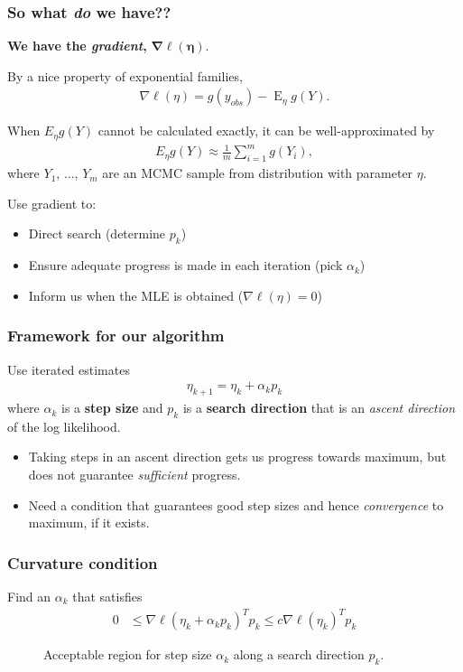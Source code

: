 \documentclass[ 10pt]{beamer}
\DeclareMathOperator{\E}{E}
\begin{document}
\frame
{
\frametitle{So what \emph{do} we have??}

{\textbf{We have the \emph{gradient},} $\boldsymbol{\nabla \ell(\eta)}$.}
\vspace*{2mm}

By a nice property of exponential families,
\begin{align*}
	\nabla \ell( \eta ) = g(y_{obs}) - \E_{\eta} g(Y).
\end{align*}

\pause
When $E_\eta g(Y)$ cannot be calculated exactly, it can be well-approximated by
\begin{align*}
E_\eta g(Y) \approx \frac{1}{m}\sum_{i = 1}^m g(Y_i),
\end{align*}
where $Y_1$, $\ldots$, $Y_m$ are an MCMC sample from distribution with parameter $\eta$.
\vspace*{4mm}

\pause
Use gradient to: 
\vspace*{2mm}
\begin{itemize}
\item Direct search  (determine $p_k$)
\vspace*{2mm}

\item Ensure adequate progress is made in each iteration  (pick $\alpha_k$)
\vspace*{2mm}

\item Inform us when the MLE is obtained  ($\nabla \ell(\eta) = 0$)
\end{itemize}

}

\frame
{
\frametitle{Framework for our algorithm}
Use iterated estimates
\begin{align*}
	\eta_{k+1} = \eta_k + \alpha_k p_k
\end{align*}
where $\alpha_k$ is a \textbf{step size} and  $p_k$ is a \textbf{search direction} that
is an \emph{ascent direction} of the log likelihood.
\vspace{3mm}

\pause
\begin{itemize}
\item Taking steps in an ascent direction gets us progress towards maximum, but does not guarantee \emph{sufficient} progress.
\vspace{3mm}

\item Need a condition that guarantees good step sizes and hence \emph{convergence} to maximum, if it exists.
\end{itemize}

}
\frame
{
  \frametitle{Curvature condition}
Find an $\alpha_k$ that satisfies
\begin{align*}
	 0 & \leq \nabla \ell( \eta_k + \alpha_k p_k)^T p_k \leq c \nabla \ell(\eta_k)^T 
p_k
\end{align*}
\begin{figure}[h]
\centering
    \scalebox{.25}{}
	\caption{Acceptable region for step size $\alpha_k$ along a search direction $p_k$.}
\label{F:alpha_region}
\end{figure}
}
\end{document}
